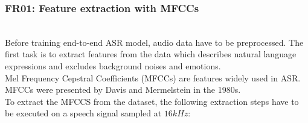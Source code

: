 
\subsubsection{FR01: Feature extraction with MFCCs}\label{mfccs}~\\


Before training end-to-end ASR model, audio data have to be preprocessed. The
first task is to extract features from the data which describes natural language
expressions and excludes background noises and emotions.\\


Mel Frequency Cepstral Coefficients (MFCCs) are features widely used in ASR.
MFCCs were presented by Davis and Mermelstein in the 1980s.~\cite{mfcc}\\

To extract the MFCCS from the dataset, the following extraction steps have to be
executed on a speech signal sampled at $16kHz$:\\

